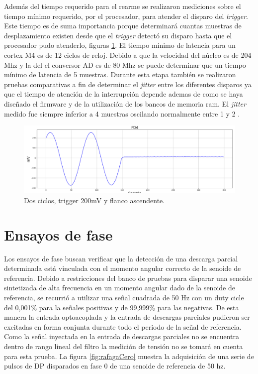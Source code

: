 \vspace{5mm}

Además del tiempo requerido para el rearme se realizaron mediciones sobre el tiempo mínimo requerido, por el procesador, para atender el disparo del \textit{trigger}. Este tiempo es de suma importancia porque determinará cuantas muestras de desplazamiento existen desde que el \textit{trigger} detectó su disparo hasta que el procesador pudo atenderlo, figuras \ref{fig:tiempoInicial}. El tiempo mínimo de latencia para un cortex M4 es de 12 ciclos de reloj. Debido a que la velocidad del núcleo es de 204 Mhz y la del el conversor AD es de 80 Mhz se puede determinar que un tiempo mínimo de latencia de 5 muestras. Durante esta etapa también se realizaron pruebas comparativas a fin de determinar el \textit{jitter} entre los diferentes disparos ya que el tiempo de atención de la interrupción depende ademas de como se haya diseñado el firmware y de la utilización de los bancos de memoria ram. El \textit{jitter} medido fue siempre inferior a 4 muestras oscilando normalmente entre 1 y 2 .

\vspace{5mm}

\begin{figure}[ht]
	\centering
	\includegraphics[width=130mm]{./Figures/tiempoInicial.png}
	\caption{Dos ciclos, trigger 200mV y flanco ascendente.}
	\label{fig:tiempoInicial}
\end{figure}


\section{Ensayos de fase}

Los ensayos de fase buscan verificar que la detección de una descarga parcial determinada está vinculada con el momento angular correcto de la senoide de referencia.
Debido a restricciones del banco de pruebas para disparar una senoide sintetizada de alta frecuencia en un momento angular dado de la senoide de referencia, se recurrió a utilizar una señal cuadrada de 50 Hz con un duty cicle del 0,001\% para la señales positivas y de 99,999\% para las negativas. De esta manera la entrada optoacoplada y la entrada de descargas parciales pudieron ser excitadas en forma conjunta durante todo el periodo de la señal de referencia.
Como la señal inyectada en la entrada de descargas parciales no se encuentra dentro de rango lineal del filtro la medición de tensión no se tomará en cuenta para esta prueba.
La figura \ref{fig:rafagaCero} muestra la adquisición de una serie de pulsos de DP disparados en fase 0 de una senoide de referencia de 50 hz.

